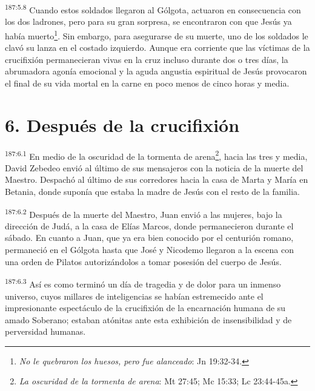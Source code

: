 \par 
\textsuperscript{187:5.8} Cuando estos soldados llegaron al Gólgota, actuaron en consecuencia con los dos ladrones, pero para su gran sorpresa, se encontraron con que Jesús ya había muerto\footnote{\textit{No le quebraron los huesos, pero fue alanceado}: Jn 19:32-34.}. Sin embargo, para asegurarse de su muerte, uno de los soldados le clavó su lanza en el costado izquierdo. Aunque era corriente que las víctimas de la crucifixión permanecieran vivas en la cruz incluso durante dos o tres días, la abrumadora agonía emocional y la aguda angustia espiritual de Jesús provocaron el final de su vida mortal en la carne en poco menos de cinco horas y media.

\section*{6. Después de la crucifixión}
\par 
\textsuperscript{187:6.1} En medio de la oscuridad de la tormenta de arena\footnote{\textit{La oscuridad de la tormenta de arena}: Mt 27:45; Mc 15:33; Lc 23:44-45a.}, hacia las tres y media, David Zebedeo envió al último de sus mensajeros con la noticia de la muerte del Maestro. Despachó al último de sus corredores hacia la casa de Marta y María en Betania, donde suponía que estaba la madre de Jesús con el resto de la familia.

\par 
\textsuperscript{187:6.2} Después de la muerte del Maestro, Juan envió a las mujeres, bajo la dirección de Judá, a la casa de Elías Marcos, donde permanecieron durante el sábado. En cuanto a Juan, que ya era bien conocido por el centurión romano, permaneció en el Gólgota hasta que José y Nicodemo llegaron a la escena con una orden de Pilatos autorizándolos a tomar posesión del cuerpo de Jesús.

\par 
\textsuperscript{187:6.3} Así es como terminó un día de tragedia y de dolor para un inmenso universo, cuyos millares de inteligencias se habían estremecido ante el impresionante espectáculo de la crucifixión de la encarnación humana de su amado Soberano; estaban atónitas ante esta exhibición de insensibilidad y de perversidad humanas.